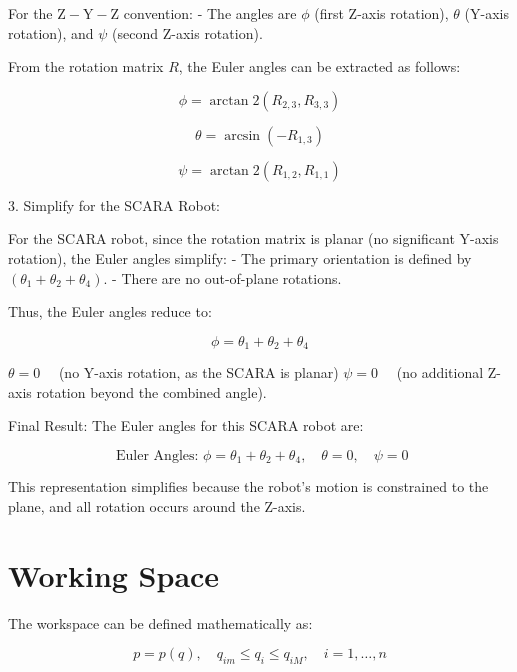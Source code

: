 \documentclass[12pt]{report}
\begin{document}
For the $\mathrm{Z}-\mathrm{Y}-\mathrm{Z}$ convention:
- The angles are $\phi$ (first Z-axis rotation), $\theta$ (Y-axis rotation), and $\psi$ (second Z-axis rotation).

From the rotation matrix $R$, the Euler angles can be extracted as follows:

\begin{equation}
	\phi = \arctan2\left(R_{2,3}, R_{3,3}\right)
\end{equation}

\begin{equation}
	\theta = \arcsin\left(-R_{1,3}\right)
\end{equation}

\begin{equation}
	\psi = \arctan2\left(R_{1,2}, R_{1,1}\right)
\end{equation}


3. Simplify for the SCARA Robot:

For the SCARA robot, since the rotation matrix is planar (no significant Y-axis rotation), the Euler angles simplify:
- The primary orientation is defined by $\left(\theta_1+\theta_2+\theta_4\right)$.
- There are no out-of-plane rotations.

Thus, the Euler angles reduce to:

$$
\phi=\theta_1+\theta_2+\theta_4
$$

$\theta=0 \quad$ (no Y-axis rotation, as the SCARA is planar)
$\psi=0 \quad$ (no additional Z-axis rotation beyond the combined angle).

Final Result:
The Euler angles for this SCARA robot are:

$$
\text { Euler Angles: } \phi=\theta_1+\theta_2+\theta_4, \quad \theta=0, \quad \psi=0
$$


This representation simplifies because the robot's motion is constrained to the plane, and all rotation occurs around the Z-axis.

	\chapter{Working Space}
		\addtocounter{section}{2} 
	\addtocounter{subsection}{0}
	
The workspace can be defined mathematically as:

\begin{equation}
	p = p(q), \quad q_{im} \leq q_i \leq q_{iM}, \quad i = 1, \ldots, n
\end{equation}
\end{document}
